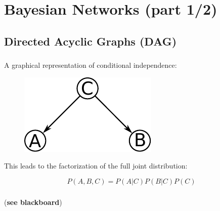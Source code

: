 \section{Bayesian Networks (part 1/2)}






\subsection{Directed Acyclic Graphs (DAG)}


\begin{frame}\frametitle{\subsecname}

A graphical representation of conditional independence:
\begin{figure}[h]
	\centering
	\includegraphics[width=0.3\linewidth]{img/cond}%
    \label{fig:cond}%
\end{figure}

This leads to the factorization of the full joint distribution:

\begin{equation}
P(A,B,C) = P(A|C)P(B|C)P(C)
\end{equation}

\end{frame}


\begin{frame}\frametitle{\subsecname}
    

(\textbf{see blackboard})

\end{frame}

